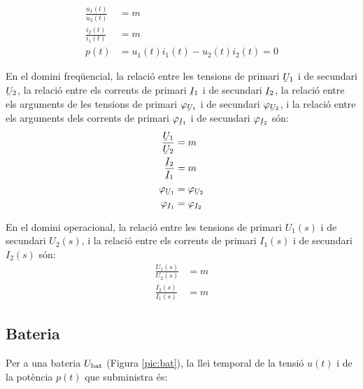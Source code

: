 \hfill
\begin{minipage}[b]{6cm}
    
    \label{pic:transf}
\end{minipage}
\hfill
\begin{minipage}[b][3.7cm][t]{10cm}
   \begin{align}
      \frac{u_1(t)}{u_2(t)} &= m  \\
      \frac{i_2(t)}{i_1(t)} &= m \\
      p(t) &= u_1(t) i_1(t) - u_2(t) i_2(t) = 0
   \end{align}
\end{minipage}


 En el domini
freq\"{u}encial, la relaci\'{o} entre les tensions de primari $\cmplx{U}_1$
i de secundari $\cmplx{U}_2$, la relaci\'{o} entre els corrents de
primari $\cmplx{I}_1$ i de secundari $\cmplx{I}_2$, la relaci\'{o} entre
els arguments de les tensions de primari $\varphi_{\cmplx{U}_1}$ i
de secundari $\varphi_{\cmplx{U}_2}$, i  la relaci\'{o} entre els
arguments dels corrents de primari $\varphi_{\cmplx{I}_1}$ i de
secundari $\varphi_{\cmplx{I}_2}$ s\'{o}n:
\begin{align}
   \frac{\cmplx{U}_1}{\cmplx{U}_2} &= m  \\
   \frac{\cmplx{I}_2}{\cmplx{I}_1} &= m \\
   \varphi_{\cmplx{U}_1} &= \varphi_{\cmplx{U}_2} \\
   \varphi_{\cmplx{I}_1} &= \varphi_{\cmplx{I}_2}
\end{align}

 En el domini operacional, la relaci\'{o} entre les tensions de primari $U_1(s)$ i de secundari $U_2(s)$,  i la relaci\'{o} entre els corrents de primari $I_1(s)$ i de secundari $I_2(s)$ s\'{o}n:
\begin{align}
   \frac{U_1(s)}{U_2(s)} &= m  \\
   \frac{I_2(s)}{I_1(s)} &= m
\end{align}

\subsection{Bateria} 

Per a una bateria $U_\mathrm{bat}$ (Figura
\vref{pic:bat}), la llei temporal de la tensi\'{o} $u(t)$ i de la
pot\`{e}ncia $p(t)$ que subministra \'{e}s:

